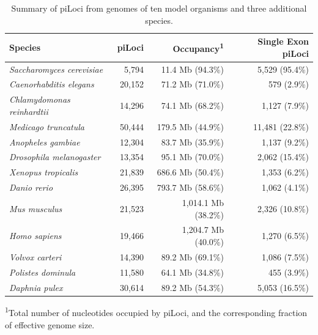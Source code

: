 \begin{table}[h]
\caption{Summary of piLoci from genomes of ten model organisms and three additional species.}
\label{Table:piLocusSingleGeneFraction}
\begin{tabularx}{\textwidth}{lrrr}
\hline
                            Species &               piLoci &  Occupancy\textsuperscript{1} &   Single Exon piLoci  \\ \hline
\textit{Saccharomyces cerevisiae}   &                5,794 &              11.4 Mb (94.3\%) &       5,529 (95.4\%)  \\
\textit{Caenorhabditis elegans}     &               20,152 &              71.2 Mb (71.0\%) &          579 (2.9\%)  \\
\textit{Chlamydomonas reinhardtii}  &               14,296 &              74.1 Mb (68.2\%) &        1,127 (7.9\%)  \\
\textit{Medicago truncatula}        &               50,444 &             179.5 Mb (44.9\%) &      11,481 (22.8\%)  \\
\textit{Anopheles gambiae}          &               12,304 &              83.7 Mb (35.9\%) &        1,137 (9.2\%)  \\
\textit{Drosophila melanogaster}    &               13,354 &              95.1 Mb (70.0\%) &       2,062 (15.4\%)  \\
\textit{Xenopus tropicalis}         &               21,839 &             686.6 Mb (50.4\%) &        1,353 (6.2\%)  \\
\textit{Danio rerio}                &               26,395 &             793.7 Mb (58.6\%) &        1,062 (4.1\%)  \\
\textit{Mus musculus}               &               21,523 &           1,014.1 Mb (38.2\%) &       2,326 (10.8\%)  \\
\textit{Homo sapiens}               &               19,466 &           1,204.7 Mb (40.0\%) &        1,270 (6.5\%)  \\ \hline
\textit{Volvox carteri}             &               14,390 &              89.2 Mb (69.1\%) &        1,086 (7.5\%)  \\
\textit{Polistes dominula}          &               11,580 &              64.1 Mb (34.8\%) &          455 (3.9\%)  \\
\textit{Daphnia pulex}              &               30,614 &              89.2 Mb (54.3\%) &       5,053 (16.5\%)  \\ \hline
\end{tabularx}
\raggedright
{\scriptsize
\textsuperscript{1}Total number of nucleotides occupied by piLoci, and the corresponding fraction of effective genome size.
}
\end{table}

